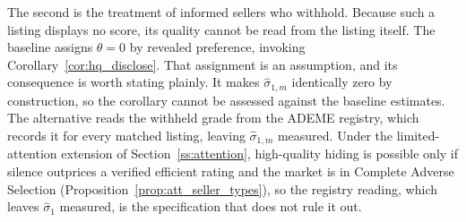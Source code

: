 The second is the treatment of informed sellers who withhold. Because such a listing displays
no score, its quality cannot be read from the listing itself. The baseline assigns
$\theta=0$ by revealed preference, invoking Corollary~\ref{cor:hq_disclose}. That assignment
is an assumption, and its consequence is worth stating plainly. It makes
$\hat\sigma_{1,m}$ identically zero by construction, so the corollary cannot be assessed
against the baseline estimates. The alternative reads the withheld grade from the ADEME
registry, which records it for every matched listing, leaving $\hat\sigma_{1,m}$ measured. Under the limited-attention extension of Section~\ref{ss:attention}, high-quality hiding is possible only if silence outprices a verified efficient rating and the market is in Complete Adverse Selection (Proposition~\ref{prop:att_seller_types}), so the registry reading, which leaves $\hat\sigma_1$ measured, is the specification that does not rule it out.
